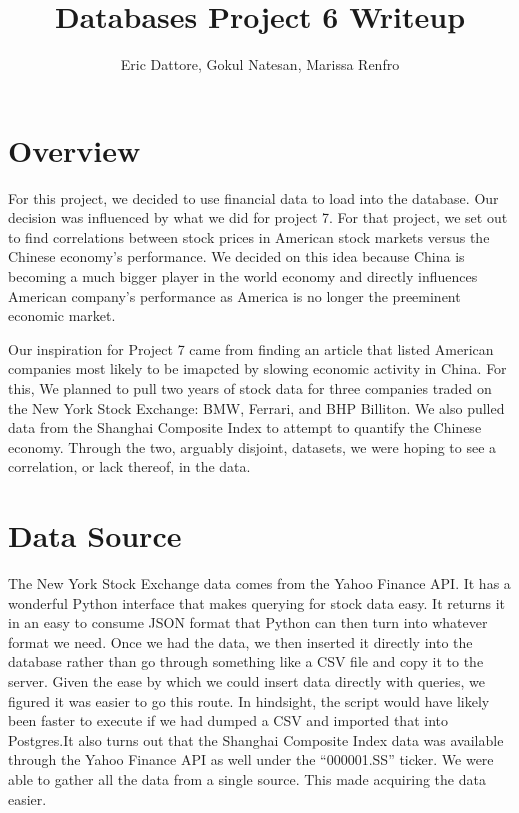 \documentclass{article}
\author{Eric Dattore, Gokul Natesan, Marissa Renfro}
\title{Databases Project 6 Writeup}
\date{}
\begin{document}
    \maketitle

    \section*{Overview}
    For this project, we decided to use financial data to load into the
    database. Our decision was influenced by what we did for project 7.
    For that project, we set out to find correlations between stock prices
    in American stock markets versus the Chinese economy's performance.
    We decided on this idea because China is becoming a much bigger player
    in the world economy and directly influences American company's performance
    as America is no longer the preeminent economic market.

    Our inspiration for Project 7 came from finding an article that listed American
    companies most likely to be imapcted by slowing economic activity in China. For this,
    We planned to pull two years of stock data for three companies traded on the New York
    Stock Exchange: BMW, Ferrari, and BHP Billiton. We also pulled data from the Shanghai Composite
    Index to attempt to quantify the Chinese economy. Through the two, arguably disjoint, datasets, we
    were hoping to see a correlation, or lack thereof, in the data.
    \section*{Data Source}
    The New York Stock Exchange data comes from the Yahoo Finance API. It has a wonderful Python
    interface that makes querying for stock data easy. It returns it in an easy to consume JSON format
    that Python can then turn into whatever format we need. Once we had the data, we then inserted it
    directly into the database rather than go through something like a CSV file and copy it to the server.
    Given the ease by which we could insert data directly with queries, we figured it was easier to go this
    route. In hindsight, the script would have likely been faster to execute if we had dumped a CSV and
    imported that into Postgres.It also turns out that the Shanghai Composite Index
    data was available through the Yahoo Finance API as well under the ``000001.SS'' ticker. We were
    able to gather all the data from a single source. This made acquiring the data easier.
\end{document}
